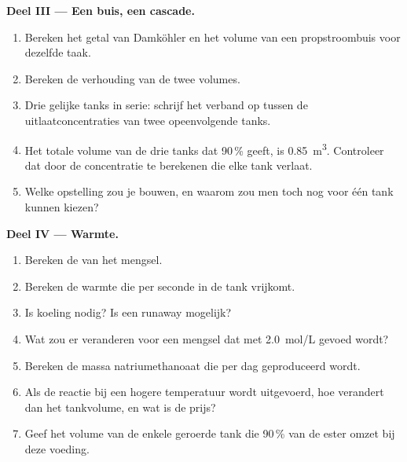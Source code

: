 \begin{problem}
\medskip
\noindent\textbf{Deel III --- Een buis, een cascade.}
\begin{enumerate}[resume]
  \item Bereken het getal van Damköhler en het volume van een propstroombuis voor
        dezelfde taak.
  \item Bereken de verhouding van de twee volumes.
  \item Drie gelijke tanks in serie: schrijf het verband op tussen de
        uitlaatconcentraties van twee opeenvolgende tanks.
  \item Het totale volume van de drie tanks dat 90\,\% geeft, is
        \qty{0.85}{m^3}. Controleer dat door de concentratie te berekenen die elke
        tank verlaat.
  \item Welke opstelling zou je bouwen, en waarom zou men toch nog voor één tank
        kunnen kiezen?
\end{enumerate}

\medskip
\noindent\textbf{Deel IV --- Warmte.}
\begin{enumerate}[resume]
  \item Bereken de  van het mengsel.
  \item Bereken de warmte die per seconde in de tank vrijkomt.
  \item Is koeling nodig? Is een runaway mogelijk?
  \item Wat zou er veranderen voor een mengsel dat met \qty{2.0}{mol/L} gevoed wordt?
  \item Bereken de massa natriumethanoaat die per dag geproduceerd wordt.
  \item Als de reactie bij een hogere temperatuur wordt uitgevoerd, hoe verandert dan het
        tankvolume, en wat is de prijs?
  \item Geef het volume van de enkele geroerde tank die 90\,\% van
        de ester omzet bij deze voeding.
\end{enumerate}
\end{problem}
